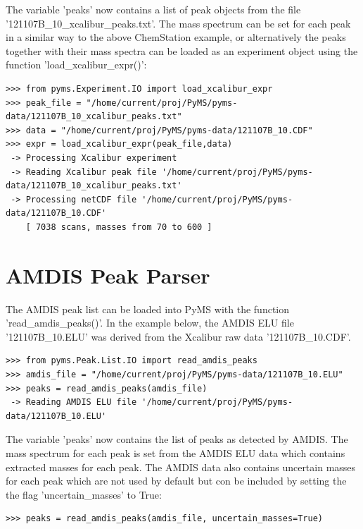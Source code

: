 \noindent
The variable 'peaks' now contains a list of peak objects from the file
'121107B\_10\_xcalibur\_peaks.txt'. The mass spectrum can be set for each peak in a 
similar way to the above ChemStation example, or alternatively the peaks together
with their mass spectra can be loaded as an experiment object using the function 
'load\_xcalibur\_expr()':

\begin{verbatim}
>>> from pyms.Experiment.IO import load_xcalibur_expr
>>> peak_file = "/home/current/proj/PyMS/pyms-data/121107B_10_xcalibur_peaks.txt"
>>> data = "/home/current/proj/PyMS/pyms-data/121107B_10.CDF"
>>> expr = load_xcalibur_expr(peak_file,data)
 -> Processing Xcalibur experiment
 -> Reading Xcalibur peak file '/home/current/proj/PyMS/pyms-data/121107B_10_xcalibur_peaks.txt'
 -> Processing netCDF file '/home/current/proj/PyMS/pyms-data/121107B_10.CDF'
    [ 7038 scans, masses from 70 to 600 ]
\end{verbatim}

\section{AMDIS Peak Parser}


The AMDIS peak list can be loaded into PyMS with the function 'read\_amdis\_peaks()'.
In the example below, the AMDIS ELU file '121107B\_10.ELU' was derived from the
Xcalibur raw data '121107B\_10.CDF'. 

\begin{verbatim}
>>> from pyms.Peak.List.IO import read_amdis_peaks
>>> amdis_file = "/home/current/proj/PyMS/pyms-data/121107B_10.ELU"
>>> peaks = read_amdis_peaks(amdis_file)
 -> Reading AMDIS ELU file '/home/current/proj/PyMS/pyms-data/121107B_10.ELU'
\end{verbatim}

\noindent
The variable 'peaks' now contains the list of peaks as detected by AMDIS.  The mass
spectrum for each peak is set from the AMDIS ELU data which contains extracted masses
for each peak. The AMDIS data also contains uncertain masses for each peak which are
not used by default but con be included by setting the the flag 'uncertain\_masses'
to True:

\begin{verbatim}
>>> peaks = read_amdis_peaks(amdis_file, uncertain_masses=True)
\end{verbatim}

